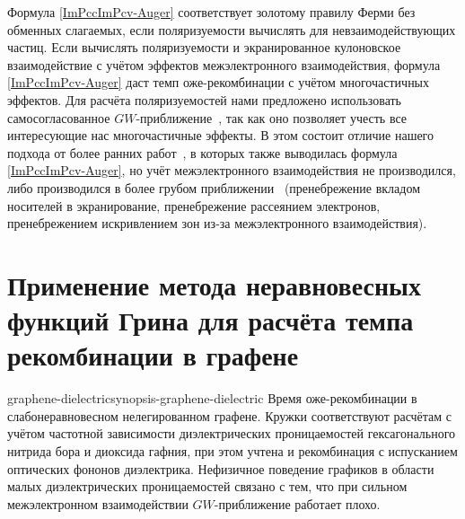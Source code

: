 Формула \eqref{ImPccImPcv-Auger} соответствует золотому правилу Ферми без обменных слагаемых, если поляризуемости вычислять для невзаимодействующих частиц. Если вычислять поляризуемости и экранированное кулоновское взаимодействие с учётом эффектов межэлектронного взаимодействия, формула \eqref{ImPccImPcv-Auger} даст темп оже-рекомбинации с учётом многочастичных эффектов. Для расчёта поляризуемостей нами предложено использовать самосогласованное $GW$-приближение~\cite{NEGF-GW}, так как оно позволяет учесть все интересующие нас многочастичные эффекты. В этом состоит отличие нашего подхода от более ранних работ~\cite{Ziep-Mocker,Yevick-GW_Auger}, в которых также выводилась формула \eqref{ImPccImPcv-Auger}, но учёт межэлектронного взаимодействия не производился, либо производился в более грубом приближении~\cite{Auger_scattering} (пренебрежение вкладом носителей в экранирование, пренебрежение рассеянием электронов, пренебрежением искривлением зон из-за межэлектронного взаимодействия).
%
\section{Применение метода неравновесных функций Грина для расчёта темпа рекомбинации в графене}   
\begin{narrowfig}{graphene-dielectric}{synopsis-graphene-dielectric}
Время оже-рекомбинации в слабонеравновесном нелегированном графене. Кружки соответствуют расчётам с учётом частотной зависимости диэлектрических проницаемостей гексагонального нитрида бора и диоксида гафния, при этом учтена и рекомбинация с испусканием оптических фононов диэлектрика. Нефизичное поведение графиков в области малых диэлектрических проницаемостей связано с тем, что при сильном межэлектронном взаимодействии $GW$-приближение работает плохо.
\end{narrowfig}


